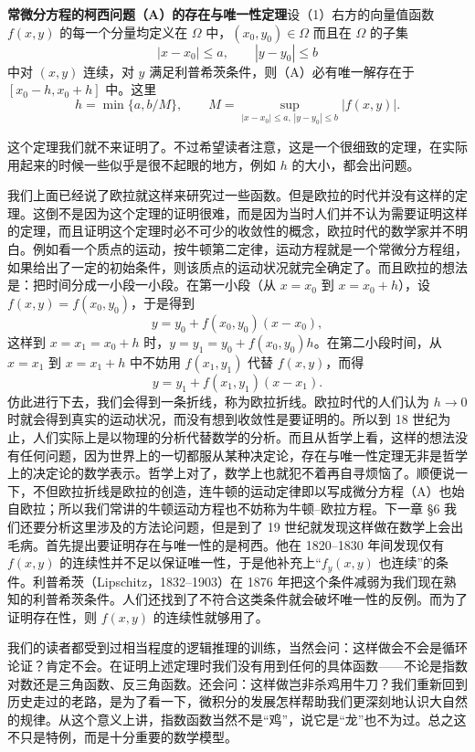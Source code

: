 \textbf{常微分方程的柯西问题（A）的存在与唯一性定理}\quad 设（1）右方的向量值函数 $f(x,y)$ 的每一个分量均定义在 $\Omega$ 中，$(x_0,y_0)\in\Omega$ 而且在 $\Omega$ 的子集
\[
|x-x_0|\le a,\qquad |y-y_0|\le b
\]
中对 $(x,y)$ 连续，对 $y$ 满足利普希茨条件，则（A）必有唯一解存在于 $[x_0-h,x_0+h]$ 中。这里
\[
h=\min\{a,b/M\},\qquad
M=\sup_{|x-x_0|\le a,\,|y-y_0|\le b}|f(x,y)|.
\]

这个定理我们就不来证明了。不过希望读者注意，这是一个很细致的定理，在实际用起来的时候一些似乎是很不起眼的地方，例如 $h$ 的大小，都会出问题。

我们上面已经说了欧拉就这样来研究过一些函数。但是欧拉的时代并没有这样的定理。这倒不是因为这个定理的证明很难，而是因为当时人们并不认为需要证明这样的定理，而且证明这个定理时必不可少的收敛性的概念，欧拉时代的数学家并不明白。例如看一个质点的运动，按牛顿第二定律，运动方程就是一个常微分方程组，如果给出了一定的初始条件，则该质点的运动状况就完全确定了。而且欧拉的想法是：把时间分成一小段一小段。在第一小段（从 $x=x_0$ 到 $x=x_0+h$），设 $f(x,y)=f(x_0,y_0)$，于是得到
\[
y=y_0+f(x_0,y_0)(x-x_0),
\]
这样到 $x=x_1=x_0+h$ 时，$y=y_1=y_0+f(x_0,y_0)h$。在第二小段时间，从 $x=x_1$ 到 $x=x_1+h$ 中不妨用 $f(x_1,y_1)$ 代替 $f(x,y)$，而得
\[
y=y_1+f(x_1,y_1)(x-x_1).
\]
仿此进行下去，我们会得到一条折线，称为欧拉折线。欧拉时代的人们认为 $h\to0$ 时就会得到真实的运动状况，而没有想到收敛性是要证明的。所以到 18 世纪为止，人们实际上是以物理的分析代替数学的分析。而且从哲学上看，这样的想法没有任何问题，因为世界上的一切都服从某种决定论，存在与唯一性定理无非是哲学上的决定论的数学表示。哲学上对了，数学上也就犯不着再自寻烦恼了。顺便说一下，不但欧拉折线是欧拉的创造，连牛顿的运动定律即以写成微分方程（A）也始自欧拉；所以我们常讲的牛顿运动方程也不妨称为牛顿--欧拉方程。下一章 §6 我们还要分析这里涉及的方法论问题，但是到了 19 世纪就发现这样做在数学上会出毛病。首先提出要证明存在与唯一性的是柯西。他在 1820--1830 年间发现仅有 $f(x,y)$ 的连续性并不足以保证唯一性，于是他补充上“$f_y(x,y)$ 也连续”的条件。利普希茨（Lipschitz，1832--1903）在 1876 年把这个条件减弱为我们现在熟知的利普希茨条件。人们还找到了不符合这类条件就会破坏唯一性的反例。而为了证明存在性，则 $f(x,y)$ 的连续性就够用了。

我们的读者都受到过相当程度的逻辑推理的训练，当然会问：这样做会不会是循环论证？肯定不会。在证明上述定理时我们没有用到任何的具体函数——不论是指数对数还是三角函数、反三角函数。还会问：这样做岂非杀鸡用牛刀？我们重新回到历史走过的老路，是为了看一下，微积分的发展怎样帮助我们更深刻地认识大自然的规律。从这个意义上讲，指数函数当然不是“鸡”，说它是“龙”也不为过。总之这不只是特例，而是十分重要的数学模型。

